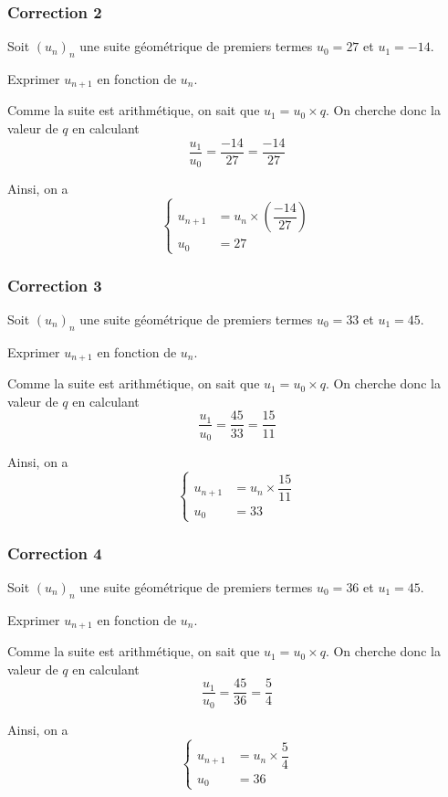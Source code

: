 \documentclass[15pt, mathserif]{beamer}
\begin{document}
\begin{frame}
\vspace{-10mm}
	\frametitle{Correction 2}
Soit $(u_n)_n$ une suite géométrique de premiers termes $u_0=27$ et $u_1=-14$. 
 
 Exprimer $u_{n+1}$ en fonction de $u_n$. 
 
 \vspace*{1cm} 
 
 Comme la suite est arithmétique, on sait que $u_1=u_0\times q$. On cherche donc la valeur de $q$ en calculant $$\dfrac{u_1}{u_0}=\dfrac{-14}{27}=\dfrac{-14}{27}$$ 
 
 Ainsi, on a $$ \left\{ 
 \begin{array}{ll} 
 u_{n+1} &= u_n \times \left( \dfrac{-14}{27} \right)  \\ 
 u_0 & = 27 
 \end{array} 
 \right. $$ 
 \end{frame}


\begin{frame}
\vspace{-10mm}
	\frametitle{Correction 3}
Soit $(u_n)_n$ une suite géométrique de premiers termes $u_0=33$ et $u_1=45$. 
 
 Exprimer $u_{n+1}$ en fonction de $u_n$. 
 
 \vspace*{1cm} 
 
 Comme la suite est arithmétique, on sait que $u_1=u_0\times q$. On cherche donc la valeur de $q$ en calculant $$\dfrac{u_1}{u_0}=\dfrac{45}{33}=\dfrac{15}{11}$$ 
 
 Ainsi, on a $$ \left\{ 
 \begin{array}{ll} 
 u_{n+1} &= u_n \times \dfrac{15}{11} \\ 
 u_0 & = 33 
 \end{array} 
 \right. $$ 
 \end{frame}


\begin{frame}
\vspace{-10mm}
	\frametitle{Correction 4}
Soit $(u_n)_n$ une suite géométrique de premiers termes $u_0=36$ et $u_1=45$. 
 
 Exprimer $u_{n+1}$ en fonction de $u_n$. 
 
 \vspace*{1cm} 
 
 Comme la suite est arithmétique, on sait que $u_1=u_0\times q$. On cherche donc la valeur de $q$ en calculant $$\dfrac{u_1}{u_0}=\dfrac{45}{36}=\dfrac{5}{4}$$ 
 
 Ainsi, on a $$ \left\{ 
 \begin{array}{ll} 
 u_{n+1} &= u_n \times \dfrac{5}{4} \\ 
 u_0 & = 36 
 \end{array} 
 \right. $$ 
 \end{frame}
\end{document}
